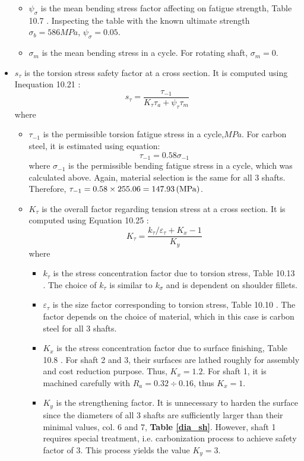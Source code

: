 \begin{itemize}
\begin{itemize}
		\item $ \psi_\sigma $ is the mean bending stress factor affecting on fatigue strength, Table 10.7 \cite{tk1}. Inspecting the table with the known ultimate strength $ \sigma_b = 586 \unit{MPa} $, $ \psi_\sigma = 0.05 $.
		\item $ \sigma_m $ is the mean bending stress in a cycle. For rotating shaft, $ \sigma_m = 0 $.
	\end{itemize}
	\item $ s_\tau $ is the torsion stress safety factor at a cross section. It is computed using Inequation 10.21 \cite{tk1}:
	\[
	s_\tau = \dfrac{\tau_{-1}}{K_\tau\tau_a + \psi_\tau\tau_m}
	\]
	where
	\begin{itemize}
		\item $ \tau_{-1} $ is the permissible torsion fatigue stress in a cycle,$ \unit{MPa} $. For carbon steel, it is estimated using equation:
		\[
		\tau_{-1} = 0.58\sigma_{-1}
		\]
		where $ \sigma_{-1} $ is the permissible bending fatigue stress in a cycle, which was calculated above. Again, material selection is the same for all 3 shafts. Therefore, $ \tau_{-1} = 0.58\times 255.06 = 147.93 \, (\mathrm{MPa}) $.
		\item $ K_\tau $ is the overall factor regarding tension stress at a cross section. It is computed using Equation 10.25 \cite{tk1}:
		\[
		K_\tau = \dfrac{k_\tau/\varepsilon_\tau + K_x - 1}{K_y}
		\]
		where
		\begin{itemize}
			\item $ k_\tau $ is the stress concentration factor due to torsion stress, Table 10.13 \cite{tk1}. The choice of $ k_\tau $ is similar to $ k_\sigma $ and is dependent on shoulder fillets.
			\item $ \varepsilon_\tau $ is the size factor corresponding to torsion stress, Table 10.10 \cite{tk1}. The factor depends on the choice of material, which in this case is carbon steel for all 3 shafts.
			\item $ K_x $ is the stress concentration factor due to surface finishing, Table 10.8 \cite{tk1}. For shaft 2 and 3, their surfaces are lathed roughly for assembly and cost reduction purpose. Thus, $ K_x = 1.2 $. For shaft 1, it is machined carefully with $ R_a = 0.32\div 0.16 $, thus $ K_x = 1 $.
			\item $ K_y $ is the strengthening factor. It is unnecessary to harden the surface since the diameters of all 3 shafts are sufficiently larger than their minimal values, col. 6 and 7, \textbf{Table \ref{dia_sh}}.  However, shaft 1 requires special treatment, i.e. carbonization process to achieve safety factor of 3. This process yields the value $ K_y = 3 $.

\end{itemize}
\end{itemize}
\end{itemize}
